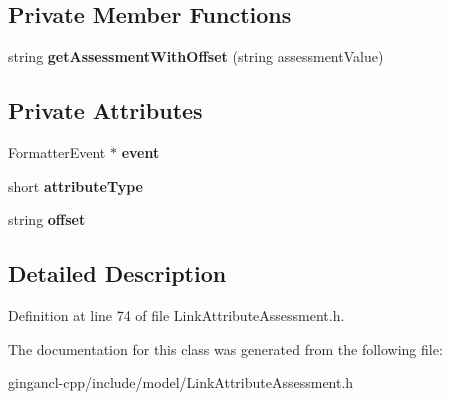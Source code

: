 \subsection*{Private Member Functions}
\begin{CompactItemize}
\item 
string \textbf{getAssessmentWithOffset} (string assessmentValue)\label{classbr_1_1pucrio_1_1telemidia_1_1ginga_1_1ncl_1_1model_1_1link_1_1LinkAttributeAssessment_b580d9ab055f8f259cc53173e7139492}

\end{CompactItemize}
\subsection*{Private Attributes}
\begin{CompactItemize}
\item 
FormatterEvent $\ast$ {\bf event}\label{classbr_1_1pucrio_1_1telemidia_1_1ginga_1_1ncl_1_1model_1_1link_1_1LinkAttributeAssessment_c0141f472cfbecf4656651e1588d1b02}

\item 
short {\bf attributeType}\label{classbr_1_1pucrio_1_1telemidia_1_1ginga_1_1ncl_1_1model_1_1link_1_1LinkAttributeAssessment_bfdde980cda50e751a65934fa081534e}

\item 
string {\bf offset}\label{classbr_1_1pucrio_1_1telemidia_1_1ginga_1_1ncl_1_1model_1_1link_1_1LinkAttributeAssessment_48f30b2945d2b50cbfdd1e082d488482}

\end{CompactItemize}


\subsection{Detailed Description}




Definition at line 74 of file LinkAttributeAssessment.h.

The documentation for this class was generated from the following file:\begin{CompactItemize}
\item 
gingancl-cpp/include/model/LinkAttributeAssessment.h\end{CompactItemize}

